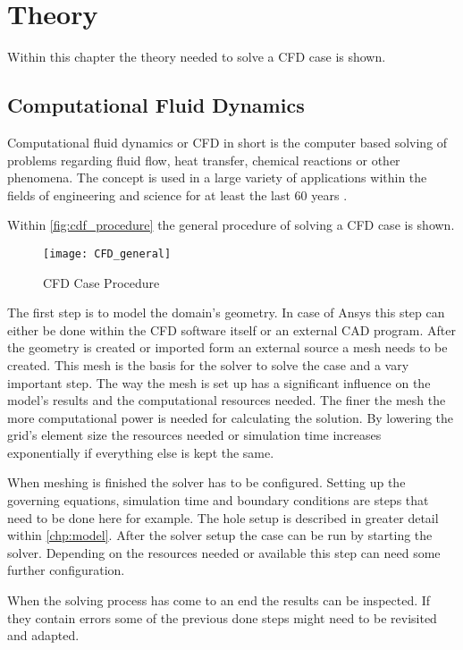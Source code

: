 \documentclass[../thesis.tex]{subfiles}
\begin{document}
\chapter{Theory}
\label{chp:theory}

Within this chapter the theory needed to solve a CFD case is shown.

\section{Computational Fluid Dynamics}

Computational fluid dynamics or CFD in short is the computer based solving of problems regarding fluid flow, heat transfer, chemical reactions or other phenomena. The concept is used in a large variety of applications within the fields of engineering and science for at least the last 60 years \cite{versteeg2007introduction}.

Within \autoref{fig:cdf_procedure} the general procedure of solving a CFD case is shown.
\begin{figure}[htbp]
	\centering
	\texttt{[image: CFD\_general]}
	\caption{CFD Case Procedure}
	\label{fig:cdf_procedure}
\end{figure}

The first step is to model the domain's geometry. In case of Ansys this step can either be done within the CFD software itself or an external CAD program. After the geometry is created or imported form an external source a mesh needs to be created. This mesh is the basis for the solver to solve the case and a vary important step. The way the mesh is set up has a significant influence on the model's results and the computational resources needed. The finer the mesh the more computational power is needed for calculating the solution. By lowering the grid's element size the resources needed or simulation time increases exponentially if everything else is kept the same.

When meshing is finished the solver has to be configured. Setting up the governing equations, simulation time and boundary conditions are steps that need to be done here for example. The hole setup is described in greater detail within \autoref{chp:model}. After the solver setup the case can be run by starting the solver. Depending on the resources needed or available this step can need some further configuration.

When the solving process has come to an end the results can be inspected. If they contain errors some of the previous done steps might need to be revisited and adapted. 
\end{document}

